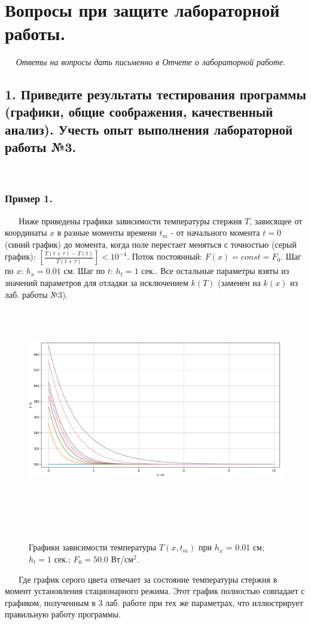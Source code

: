 \documentclass[a4paper,12pt]{article}
\begin{document}
	 
	 \section*{Вопросы при защите лабораторной работы.}
	 
	 \textit{Ответы на вопросы дать письменно в Отчете о лабораторной работе.}
	 
	 \subsection*{1. Приведите результаты тестирования программы (графики, общие соображения, качественный анализ). Учесть опыт выполнения лабораторной работы №3.}
 	
 	\subsubsection*{Пример 1.}
 	
 	Ниже приведены графики зависимости температуры стержня $T$, зависящее от координаты $x$ в разные моменты времени $t_m$ - от начального момента $t = 0$ (синий график) до момента, когда поле перестает меняться с точностью (серый график): $\left[\frac{T(t + \tau) - T(t)}{T(t + \tau)}\right] < 10^{-4}$. Поток постоянный: $F(x) = const = F_0$. Шаг по $x$: $h_x = 0.01$ см. Шаг по $t$: $h_t = 1$ сек.. Все остальные параметры взяты из значений параметров для отладки за исключением $k(T)$ (заменен на $k(x)$ из лаб. работы №3). 
 	\newpage
 	\begin{figure}[h!]
 		\begin{center}
 			{\includegraphics[scale = 0.4]{3.png}}
 			\label{ris:3}
 		\end{center}
 		\caption{Графики зависимости температуры $T(x, t_m)$ при $h_x$ = 0.01 см; $h_t = 1$ сек.; $F_0 = 50.0$ Вт/см$^2$.}
 	\end{figure}
 
 	\linebreak Где график серого цвета отвечает за состояние температуры стержня в момент установления стационарного режима. Этот график полностью совпадает с графиком, полученным в 3 лаб. работе при тех же параметрах, что иллюстрирует правильную работу программы.
\end{document}
